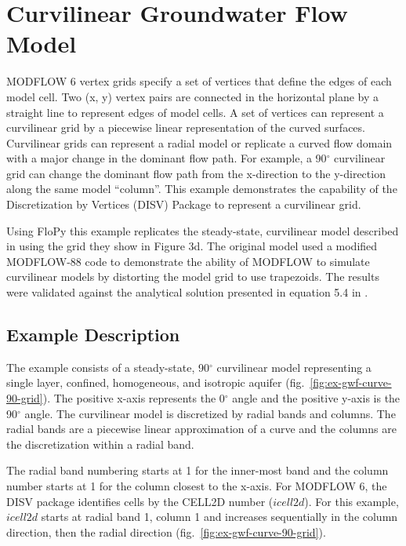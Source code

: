 \section{Curvilinear Groundwater Flow Model}
MODFLOW 6 vertex grids specify a set of vertices that define the edges of each model cell. Two (x, y) vertex pairs are connected in the horizontal plane by a straight line to represent edges of model cells. A set of vertices can represent a curvilinear grid \citep{romero2006grid} by a piecewise linear representation of the curved surfaces. Curvilinear grids can represent a radial model or replicate a curved flow domain with a major change in the dominant flow path. For example, a 90$^{\circ}$ curvilinear grid can change the dominant flow path from the x-direction to the y-direction along the same model ``column''.  This example demonstrates the capability of the Discretization by Vertices (DISV) Package to represent a curvilinear grid.

Using FloPy this example replicates the steady-state, curvilinear model described in \cite{romero2006grid} using the grid they show in Figure 3d. The original model used a modified MODFLOW-88 \citep{modflow88} code to demonstrate the ability of MODFLOW to simulate curvilinear models by distorting the model grid to use trapezoids. The results were validated against the analytical solution presented in equation 5.4 in \cite{crank1975diffusion}.


\subsection{Example Description}

The example consists of a steady-state, 90$^{\circ}$ curvilinear model representing a single layer, confined, homogeneous, and isotropic aquifer (fig.~\ref{fig:ex-gwf-curve-90-grid}). The positive x-axis represents the 0$^{\circ}$ angle and the positive y-axis is the 90$^{\circ}$ angle. The curvilinear model is discretized by radial bands and columns. The radial bands are a piecewise linear approximation of a curve and the columns are the discretization within a radial band.

The radial band numbering starts at 1 for the inner-most band and the column number starts at 1 for the column closest to the x-axis. For MODFLOW 6, the DISV package identifies cells by the CELL2D number ($icell2d$). For this example, $icell2d$ starts at radial band 1, column 1 and increases sequentially in the column direction, then the radial direction (fig.~\ref{fig:ex-gwf-curve-90-grid}).

